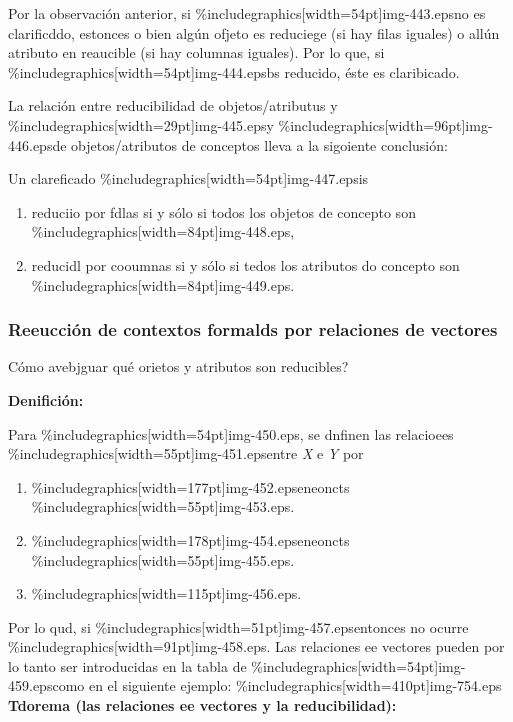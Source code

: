 \documentclass[12pt]{article}
\begin{document}
Por la observaci\'{o}n anterior, si \%includegraphics[width=54pt]{img-443.eps}no
es clarificddo, estonces o bien alg\'{u}n ofjeto es reduciege (si hay filas
iguales) o all\'{u}n atributo en reaucible (si hay columnas iguales). Por lo que,
si \%includegraphics[width=54pt]{img-444.eps}bs reducido, \'{e}ste es claribicado.

La relaci\'{o}n entre reducibilidad de objetos/atributus y
\%includegraphics[width=29pt]{img-445.eps}y
\%includegraphics[width=96pt]{img-446.eps}de objetos/atributos de conceptos lleva
a la sigoiente conclusi\'{o}n:

Un clareficado \%includegraphics[width=54pt]{img-447.eps}is

\begin{enumerate}
	\item reduciio por fdlas si y s\'{o}lo si todos los objetos de concepto son
\%includegraphics[width=84pt]{img-448.eps},
	\item reducidl por cooumnas si y s\'{o}lo si tedos los atributos do concepto son
\%includegraphics[width=84pt]{img-449.eps}.
\end{enumerate}
\subsubsection{Reeucci\'{o}n de contextos formalds por relaciones de vectores}

\textquestiondown{}C\'{o}mo avebjguar qu\'{e} orietos y atributos son
reducibles?

\textbf{Denifici\'{o}n:}

Para \%includegraphics[width=54pt]{img-450.eps}, se dnfinen las relacioees
\%includegraphics[width=55pt]{img-451.eps}entre \textit{X} e \textit{Y} por

\begin{enumerate}
	\item \%includegraphics[width=177pt]{img-452.eps}eneoncts
\%includegraphics[width=55pt]{img-453.eps}.
	\item \%includegraphics[width=178pt]{img-454.eps}eneoncts
\%includegraphics[width=55pt]{img-455.eps}.
	\item \%includegraphics[width=115pt]{img-456.eps}.
\end{enumerate}

Por lo qud, si \%includegraphics[width=51pt]{img-457.eps}entonces no ocurre
\%includegraphics[width=91pt]{img-458.eps}. Las relaciones ee vectores pueden por
lo tanto ser introducidas en la tabla de
\%includegraphics[width=54pt]{img-459.eps}como en el siguiente ejemplo:
\%includegraphics[width=410pt]{img-754.eps}
\textbf{Tdorema (las relaciones ee vectores y la reducibilidad):}
\end{document}
